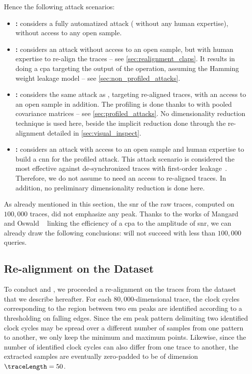 Hence the following attack scenarios:
\begin{itemize}
	\item \textbf{\attLDADesync{}:} considers a fully automatized attack (\ie{} without any human expertise), without access to any open sample.
	\item \textbf{\attCPASync{}:} considers an attack without access to an open sample, but with human expertise to re-align the traces -- see \autoref{sec:realignment_claps}.
	It results in doing a \gls{cpa} targeting the output of the \sub{} operation, assuming the Hamming weight leakage model -- see \autoref{sec:non_profiled_attacks}.
	\item \textbf{\attLDASync{}:} considers the same attack as \attCPASync{}, \ie{} targeting re-aligned traces, with an access to an open sample in addition.
	The profiling is done thanks to  with pooled covariance matrices -- see \autoref{sec:profiled_attacks}.
	No dimensionality reduction technique is used here, beside the implicit reduction done through the re-alignment detailed in \autoref{sec:visual_inspect}.
	\item \textbf{\attCNN{}:} considers an attack with access to an open sample and human expertise to build a \gls{cnn} for the profiled attack.
	This attack scenario is considered the most effective against de-synchronized traces with first-order leakage~\cite{cagli_convolutional_2017,kim_make_2019,prouff_study_2018}.
	Therefore, we do not assume \attCNN{} to need an access to re-aligned traces.
	In addition, no preliminary dimensionality reduction is done here.
\end{itemize}

As already mentioned in this section, the \gls{snr} of the raw traces, computed on \(100,000\) traces, did not emphasize any peak.
Thanks to the works of Mangard \etal{}~\cite{mangard_hardware_2004,mangard_power_2007} and Oswald \etal{}~\cite{mather_does_2013} linking the efficiency of a \gls{cpa} to the amplitude of \gls{snr}, we can already draw the following conclusions: \attLDADesync{} will not succeed with less than \(100,000\) queries.

\subsection{Re-alignment on the \mbedTLS{} Dataset}
\label{sec:realignment_claps}
To conduct \attCPASync{} and \attLDASync{}, we proceeded a re-alignment on the traces from the \mbedTLS{} dataset that we describe hereafter.
For each \(80,000\)-dimensional trace, the clock cycles corresponding to the region between two \gls{em} peaks are identified according to a thresholding on falling edges.
Since the \gls{em} peak pattern delimiting two identified clock cycles may be spread over a different number of samples from one pattern to another, we only keep the minimum and maximum points.
Likewise, since the number of identified clock cycles can also differ from one trace to another, the extracted samples are eventually zero-padded to be of dimension \(\traceLength=50\).

